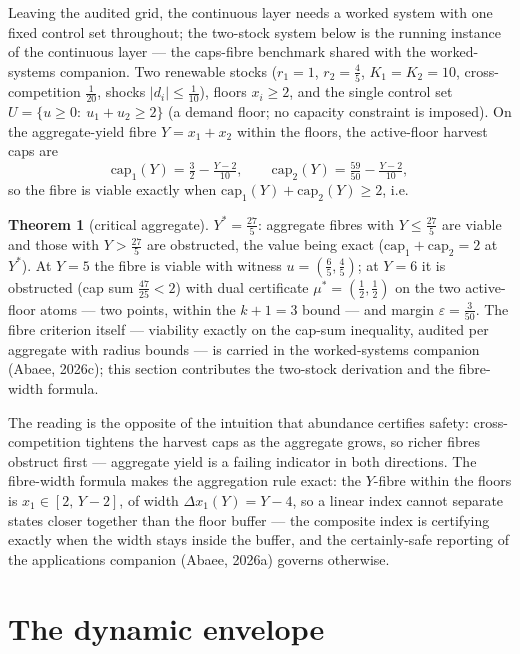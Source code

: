 \documentclass[10pt,twocolumn]{article}
\theoremstyle{definition}
\newtheorem{theorem}{Theorem}
\begin{document}
Leaving the audited grid, the continuous layer needs a worked system with
one fixed control set throughout; the two-stock system below is the
running instance of the continuous layer --- the caps-fibre benchmark
shared with the worked-systems companion. Two renewable stocks
($r_{1} = 1$, $r_{2} = \tfrac45$, $K_{1} = K_{2} = 10$, cross-competition
$\tfrac1{20}$, shocks $|d_{i}| \le \tfrac1{10}$), floors
$x_{i} \ge 2$, and the single control set
$U = \{u \ge 0:\ u_{1} + u_{2} \ge 2\}$ (a demand floor; no capacity
constraint is imposed). On the aggregate-yield fibre
$Y = x_{1} + x_{2}$ within the floors, the active-floor harvest caps are
\[
\mathrm{cap}_{1}(Y) = \tfrac32 - \tfrac{Y-2}{10},\qquad
\mathrm{cap}_{2}(Y) = \tfrac{59}{50} - \tfrac{Y-2}{10},
\]
so the fibre is viable exactly when
$\mathrm{cap}_{1}(Y) + \mathrm{cap}_{2}(Y) \ge 2$, i.e.
\begin{theorem}[critical aggregate]\label{thm:benchmark}
$Y^{*} = \tfrac{27}{5}$: aggregate fibres with $Y \le \tfrac{27}{5}$ are
viable and those with $Y > \tfrac{27}{5}$ are obstructed, the value being
exact ($\mathrm{cap}_{1} + \mathrm{cap}_{2} = 2$ at $Y^{*}$). At
$Y = 5$ the fibre is viable with witness $u = (\tfrac65,\tfrac45)$; at
$Y = 6$ it is obstructed (cap sum $\tfrac{47}{25} < 2$) with dual
certificate $\mu^{*} = (\tfrac12,\tfrac12)$ on the two active-floor
atoms --- two points, within the $k+1 = 3$ bound --- and margin
$\varepsilon = \tfrac{3}{50}$. The fibre criterion itself --- viability
exactly on the cap-sum inequality, audited per aggregate with radius
bounds --- is carried in the worked-systems companion (Abaee, 2026c);
this section contributes the two-stock derivation and the fibre-width
formula.
\end{theorem}
The reading is the opposite of the intuition that abundance certifies
safety: cross-competition tightens the harvest caps as the aggregate
grows, so richer fibres obstruct first --- aggregate yield is a failing
indicator in both directions. The fibre-width formula makes the
aggregation rule exact: the $Y$-fibre within the floors is
$x_{1} \in [2,\,Y-2]$, of width $\Delta x_{1}(Y) = Y - 4$, so a linear
index cannot separate states closer together than the floor buffer ---
the composite index is certifying exactly when the width stays inside the
buffer, and the certainly-safe reporting of the applications companion
(Abaee, 2026a) governs otherwise.

\section{The dynamic envelope}
\end{document}
